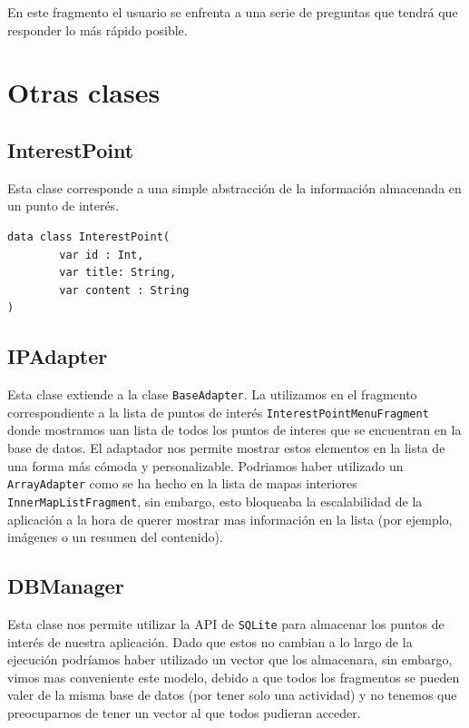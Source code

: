 \documentclass[11pt]{article}
\begin{document}
En este fragmento el usuario se enfrenta a una serie de preguntas que tendrá que responder lo más rápido posible. 

\section{Otras clases}
\label{sec:org22d57bb}

\subsection{InterestPoint}
\label{sec:orgfae7d2e}

Esta clase corresponde a una simple abstracción de la información almacenada en un punto de interés.

\begin{verbatim}
data class InterestPoint(
        var id : Int,
        var title: String,
        var content : String
)
\end{verbatim}


\subsection{IPAdapter}
\label{sec:orgbd7fca9}

Esta clase extiende a la clase \texttt{BaseAdapter}. La utilizamos en el fragmento correspondiente a la lista de puntos de interés \texttt{InterestPointMenuFragment} donde mostramos uan lista de todos los puntos de interes que se encuentran en la base de datos.
El adaptador nos permite mostrar estos elementos en la lista de una forma más cómoda y personalizable. Podriamos haber utilizado un \texttt{ArrayAdapter} como se ha hecho en la lista de mapas interiores \texttt{InnerMapListFragment}, sin embargo, esto bloqueaba la escalabilidad de la aplicación a la hora de querer mostrar mas información en la lista (por ejemplo, imágenes o un resumen del contenido).


\subsection{DBManager}
\label{sec:org292ad2b}

Esta clase nos permite utilizar la API de \texttt{SQLite} para almacenar los puntos de interés de nuestra aplicación. Dado que estos no cambian a lo largo de la ejecución podríamos haber utilizado un vector que los almacenara, sin embargo, vimos mas conveniente este modelo, debido a que todos los fragmentos se pueden valer de la misma base de datos (por tener solo una actividad) y no tenemos que preocuparnos de tener un vector al que todos pudieran acceder.
\end{document}
